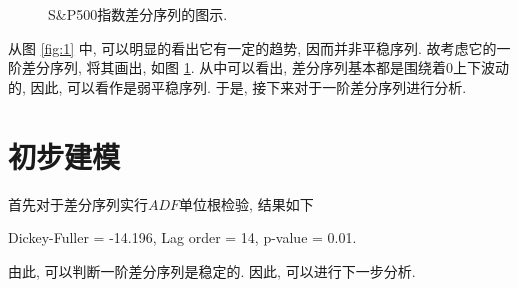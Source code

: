 \documentclass[11pt]{article}
\begin{document}
\begin{center}
\begin{minipage}{0.35\textwidth}
\begin{figure}
            \caption{S\&P500指数差分序列的图示.\label{fig:2}}
        \end{figure}
    \end{minipage}
\end{center}


从图 \ref{fig:1} 中, 可以明显的看出它有一定的趋势, 因而并非平稳序列. 故考虑它的一阶差分序列, 将其画出, 如图 \ref{fig:2}. 从中可以看出, 差分序列基本都是围绕着0上下波动的, 因此, 可以看作是弱平稳序列. 于是, 接下来对于一阶差分序列进行分析. 
\section{初步建模}
\qquad 首先对于差分序列实行$ADF$单位根检验, 结果如下
\begin{center}
    Dickey-Fuller = -14.196, Lag order = 14, p-value = 0.01. 
\end{center}
由此, 可以判断一阶差分序列是稳定的. 因此, 可以进行下一步分析. 
\end{document}
